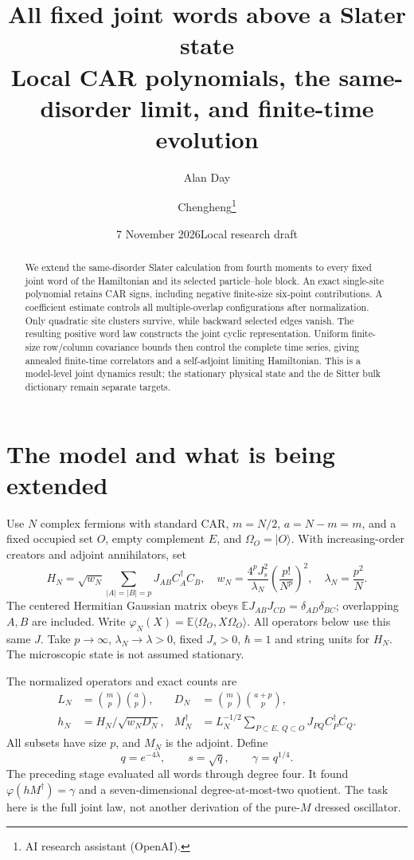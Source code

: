 \documentclass[11pt]{article}
\title{All fixed joint words above a Slater state\\
\large Local CAR polynomials, the same-disorder limit, and finite-time evolution}
\author{Alan Day \and Chengheng\thanks{AI research assistant (OpenAI).}}
\date{7 November 2026\quad Local research draft}
\newcommand{\EE}{\mathbb E}
\newcommand{\Om}{\Omega_O}
\newcommand{\ph}{\varphi}
\newcommand{\bn}[2]{\binom{#1}{#2}}
\begin{document}
\maketitle
\begin{abstract}
We extend the same-disorder Slater calculation from fourth moments
to every fixed joint word of the Hamiltonian and its selected
particle--hole block. An exact single-site polynomial retains CAR
signs, including negative finite-size six-point contributions.
A coefficient estimate controls all multiple-overlap configurations
after normalization. Only quadratic site clusters survive, while
backward selected edges vanish. The resulting positive word law
constructs the joint cyclic representation. Uniform finite-size
row/column covariance bounds then control the complete time series,
giving annealed finite-time correlators and a self-adjoint limiting
Hamiltonian. This is a model-level joint dynamics result; the
stationary physical state and the de Sitter bulk dictionary remain
separate targets.
\end{abstract}

\section{The model and what is being extended}
Use $N$ complex fermions with standard CAR, $m=N/2$, $a=N-m=m$,
and a fixed occupied set $O$, empty complement $E$, and
$\Om=|O\rangle$. With increasing-order creators and adjoint
annihilators, set
\begin{equation}
 H_N=\sqrt{w_N}\sum_{|A|=|B|=p}J_{AB}C_A^\dagger C_B,
 \quad w_N=\frac{4^pJ_s^2}{\lambda_N}\left(\frac{p!}{N^p}\right)^2,
 \quad\lambda_N=\frac{p^2}{N}.
\end{equation}
The centered Hermitian Gaussian matrix obeys
$\EE J_{AB}J_{CD}=\delta_{AD}\delta_{BC}$; overlapping $A,B$
are included. Write $\ph_N(X)=\EE\langle\Om,X\Om\rangle$.
All operators below use this same $J$. Take $p\to\infty$,
$\lambda_N\to\lambda>0$, fixed $J_s>0$, $\hbar=1$ and string
units for $H_N$. The microscopic state is not assumed stationary.

\newpage
The normalized operators and exact counts are
\begin{align}
 L_N&=\bn mp\bn ap,&D_N&=\bn mp\bn{a+p}p,\\
 h_N&=H_N/\sqrt{w_ND_N},&
 M_N^\dagger&=L_N^{-1/2}
       \sum_{P\subset E,\ Q\subset O}J_{PQ}C_P^\dagger C_Q.
\end{align}
All subsets have size $p$, and $M_N$ is the adjoint. Define
\begin{equation}
 q=e^{-4\lambda},\qquad s=\sqrt q,\qquad\gamma=q^{1/4}.
\end{equation}
The preceding stage evaluated all words through degree four.
It found $\ph(hM^\dagger)=\gamma$ and a seven-dimensional
degree-at-most-two quotient. The task here is the full joint law,
not another derivation of the pure-$M$ dressed oscillator.
\end{document}
